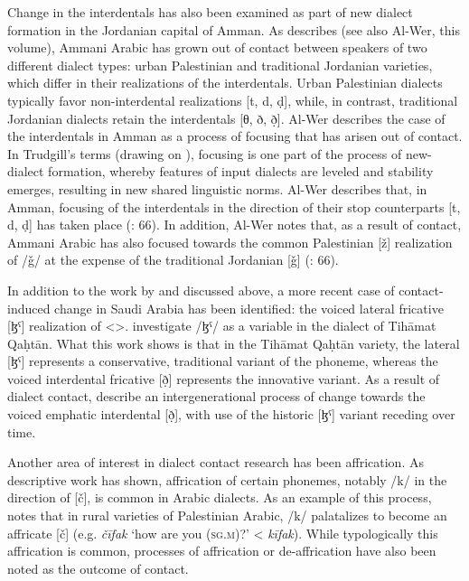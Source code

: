 \documentclass[output=paper]{langsci/langscibook}
\begin{document}
  Change in the interdentals has also been examined as part of new dialect formation in the Jordanian capital of Amman. As \citet{Al-Wer2007} describes (see also Al-Wer, this volume), Ammani Arabic has grown out of contact between speakers of two different dialect types: urban Palestinian and traditional Jordanian varieties, which differ in their realizations of the interdentals. Urban Palestinian dialects typically favor non-interdental realizations [t, d, ḍ], while, in contrast, traditional Jordanian dialects retain the interdentals [θ, ð, ð̣]. Al-Wer describes the case of the interdentals in Amman as a process of focusing \citep{Trudgill2004} that has arisen out of contact. In Trudgill’s terms (drawing on \citealt{LePageTabouret-Keller1985}), focusing is one part of the process of new-dialect formation, whereby features of input dialects are leveled and stability emerges, resulting in new shared linguistic norms. Al-Wer describes that, in Amman, focusing of the interdentals in the direction of their stop counterparts [t, d, ḍ] has taken place (\citealt{Al-Wer2007}: 66). In addition, Al-Wer notes that, as a result of contact, Ammani Arabic has also focused towards the common Palestinian [ž] realization of /ǧ/ at the expense of the traditional Jordanian [ǧ] (\citealt{Al-Wer2007}: 66).  

  In addition to the work by \citet{Al-Essa2008} and \citet{Alghamdi2014} discussed above, a more recent case of contact-induced change in Saudi Arabia has been identified: the voiced lateral fricative [ɮˤ] realization of <{}>. \citet{Al-WerAl-Qahtani2016} investigate /ɮˤ/ as a variable in the dialect of Tihāmat Qaḥtān. What this work shows is that in the Tihāmat Qaḥtān variety, the lateral [ɮˤ] represents a conservative, traditional variant of the phoneme, whereas the voiced interdental fricative [ð̣] represents the innovative variant. As a result of dialect contact, \citet{Al-WerAl-Qahtani2016} describe an intergenerational process of change towards the voiced emphatic interdental [ð̣], with use of the historic [ɮˤ] variant receding over time.

  Another area of interest in dialect contact research has been affrication. As descriptive work has shown, affrication of certain phonemes, notably /k/ in the direction of [č], is common in Arabic dialects. As an example of this process, \citet{Shahin2011} notes that in rural varieties of Palestinian Arabic, /k/ palatalizes to become an affricate [č] (e.g. \textit{čīfak} ‘how are you (\textsc{sg.m})?’ < \textit{kīfak}). While typologically this affrication is common, processes of affrication or de-affrication have also been noted as the outcome of contact. 
\end{document}
